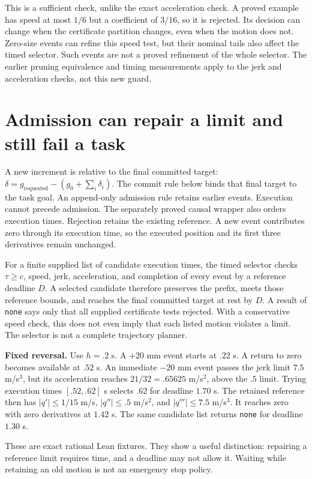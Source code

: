 \documentclass[10pt,letterpaper]{article}
\begin{document}
This is a sufficient check, unlike the exact acceleration check. A proved
example has speed at most $1/6$ but a coefficient of $3/16$, so it is rejected.
Its decision can change when the certificate partition changes, even when
the motion does not. Zero-size events can refine this speed test, but their
nominal tails also affect the timed selector. Such events are not a proved
refinement of the whole selector. The earlier pruning equivalence and timing
measurements apply to the jerk and acceleration checks, not this new guard.

\section{Admission can repair a limit and still fail a task}
A new increment is relative to the final committed target:
$\delta=g_{\mathrm{requested}}-(g_0+\sum_i\delta_i)$.
The commit rule below binds that final target to the task goal. An append-only
admission rule retains earlier events. Execution cannot precede admission.
The separately proved causal wrapper also orders execution times. Rejection
retains the existing reference. A new event contributes zero through its
execution time, so the executed position and its first three derivatives remain
unchanged.

For a finite supplied list of candidate execution times, the timed selector
checks $\tau\geq c$, speed, jerk, acceleration, and completion of every event by a
reference deadline $D$. A selected candidate therefore preserves the prefix,
meets those reference bounds, and reaches the final committed target at rest
by $D$. A result of \texttt{none} says only that all supplied certificate tests
rejected. With a conservative speed check, this does not even imply that each
listed motion violates a limit. The selector is not a complete trajectory planner.

\textbf{Fixed reversal.} Use $h=.2$ s. A $+20$ mm event starts at $.22$ s.
A return to zero becomes available at $.52$ s. An immediate $-20$ mm event
passes the jerk limit $7.5$ m/s$^3$, but its acceleration reaches
$21/32=.65625$ m/s$^2$, above the $.5$ limit. Trying execution times
$[.52,.62]$ s selects $.62$ for deadline $1.70$ s. The retained reference then
has $|q'|\leq1/15$ m/s, $|q''|\leq.5$ m/s$^2$, and $|q'''|\leq7.5$ m/s$^3$.
It reaches zero with zero derivatives at $1.42$ s. The same candidate list
returns \texttt{none} for deadline $1.30$ s.

These are exact rational Lean fixtures. They show a useful distinction:
repairing a reference limit requires time, and a deadline may not allow it.
Waiting while retaining an old motion is not an emergency stop policy.
\end{document}
